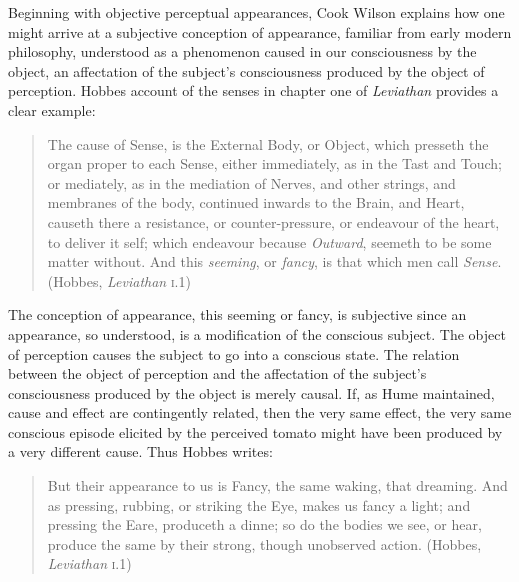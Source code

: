 \documentclass[12pt]{article}
\begin{document}
Beginning with objective perceptual appearances, Cook Wilson explains how one might arrive at a subjective conception of appearance, familiar from early modern philosophy, understood as a phenomenon caused in our consciousness by the object, an affectation of the subject's consciousness produced by the object of perception. Hobbes account of the senses in chapter one of \emph{Leviathan} provides a clear example:
\begin{quote}
    The cause of Sense, is the External Body, or Object, which presseth the organ proper to each Sense, either immediately, as in the Tast and Touch; or mediately, as in the mediation of Nerves, and other strings, and membranes of the body, continued inwards to the Brain, and Heart, causeth there a resistance, or counter-pressure, or endeavour of the heart, to deliver it self; which endeavour because \emph{Outward}, seemeth to be some matter without. And this \emph{seeming}, or \emph{fancy}, is that which men call \emph{Sense}. (Hobbes, \emph{Leviathan} \textsc{i}.1)
\end{quote}
The conception of appearance, this seeming or fancy, is subjective since an appearance, so understood, is a modification of the conscious subject. The object of perception causes the subject to go into a conscious state. The relation between the object of perception and the affectation of the subject's consciousness produced by the object is merely causal. If, as Hume maintained, cause and effect are contingently related, then the very same effect, the very same conscious episode elicited by the perceived tomato might have been produced by a very different cause. Thus Hobbes writes:
\begin{quote}
    But their appearance to us is Fancy, the same waking, that dreaming. And as pressing, rubbing, or striking the Eye, makes us fancy a light; and pressing the Eare, produceth a dinne; so do the bodies we see, or hear, produce the same by their strong, though unobserved action. (Hobbes, \emph{Leviathan} \textsc{i}.1)
\end{quote}
\end{document}
